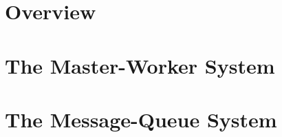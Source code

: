 \section{Overview}\label{sec:intro-init-experiment}


\section{The Master-Worker System}\label{sec:mw}


\section{The Message-Queue System}\label{sec:mq}

